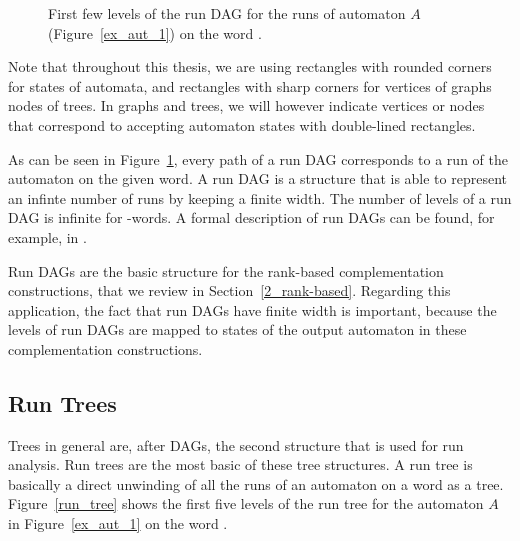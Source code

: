 \begin{figure}[htb]
\centering
\RunDAG
\caption{First few levels of the run DAG for the runs of automaton $A$ (Figure~\ref{ex_aut_1}) on the word \aom.}
\label{run_dag}
\end{figure}

Note that throughout this thesis, we are using rectangles with rounded corners for states of automata, and rectangles with sharp corners for vertices of graphs nodes of trees. In graphs and trees, we will however indicate vertices or nodes that correspond to accepting automaton states with double-lined rectangles.

As can be seen in Figure~\ref{run_dag}, every path of a run DAG corresponds to a run of the automaton on the given word. A run DAG is a structure that is able to represent an infinte number of runs by keeping a finite width. The number of levels of a run DAG is infinite for \om-words. A formal description of run DAGs can be found, for example, in \cite{fogarty2013unifying}.

Run DAGs are the basic structure for the rank-based complementation constructions, that we review in Section~\ref{2_rank-based}. Regarding this application, the fact that run DAGs have finite width is important, because the levels of run DAGs are mapped to states of the output automaton in these complementation constructions.

\subsection{Run Trees}
\label{run_trees}
Trees in general are, after DAGs, the second structure that is used for run analysis. Run trees are the most basic of these tree structures. A run tree is basically a direct unwinding of all the runs of an automaton on a word as a tree. Figure~\ref{run_tree} shows the first five levels of the run tree for the automaton $A$ in Figure~\ref{ex_aut_1} on the word \aom.



